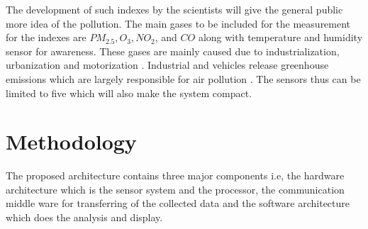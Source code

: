 \documentclass[11pt]{article}
\begin{document}
The development of such indexes by the scientists will give the general public more idea of the pollution. The main gases to be included for the measurement for the indexes are  $PM_{2.5}, O_3, NO_2$, and $CO$ along with temperature and humidity sensor for awareness. These gases are mainly caused due to industrialization, urbanization and motorization \cite{Saha1952}. Industrial and vehicles release greenhouse emissions which are largely responsible for air pollution \cite{ internet}. The sensors thus can be limited to five which will also make the system compact.


\section*{Methodology}
The proposed architecture contains three major components i.e, the hardware architecture which is the sensor system and the processor, the communication middle ware for transferring of the collected data and the software architecture which does the analysis and display.
\end{document}
